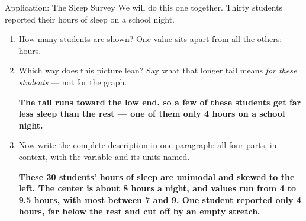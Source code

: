 \documentclass[12pt]{article}
\newcommand{\answerspace}[2]{\par\nopagebreak\noindent\begin{minipage}[t][#1][t]{\linewidth}%
  \color{keyred}\bfseries #2\end{minipage}\par}
\begin{document}
\boxguard[14]
\begin{notesbox}{Application: The Sleep Survey}
We will do this one together. Thirty students reported their hours of sleep on a school night.

\vspace{3pt}
\begin{center}
\end{center}
\vspace{2pt}

\begin{enumerate}[label=\textbf{\alph*.}, leftmargin=1.8em, itemsep=4pt]
  \item How many students are shown?  \quad One value sits apart from all the
        others:  hours.
  \item Which way does this picture lean?  \quad Say what that longer tail means
        \emph{for these students} --- not for the graph.
        \answerspace{1.6cm}{The tail runs toward the low end, so a few of these students get far
        less sleep than the rest --- one of them only 4 hours on a school night.}
  \item Now write the complete description in one paragraph: all four parts, in context, with
        the variable and its units named.
        \answerspace{2.4cm}{These 30 students' hours of sleep are unimodal and skewed to the
        left. The center is about 8 hours a night, and values run from 4 to 9.5 hours, with most
        between 7 and 9. One student reported only 4 hours, far below the rest and cut off by an
        empty stretch.}
\end{enumerate}
\end{notesbox}
\end{document}
